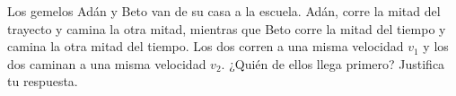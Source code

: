 Los gemelos Adán y Beto van de su casa a la escuela. Adán, corre la mitad del trayecto y camina la otra mitad, mientras que Beto corre la mitad del tiempo y camina la otra mitad del tiempo. Los dos corren a una misma velocidad $v_1$ y los dos caminan a una misma velocidad $v_2$. ¿Quién de ellos llega primero? Justifica tu respuesta.